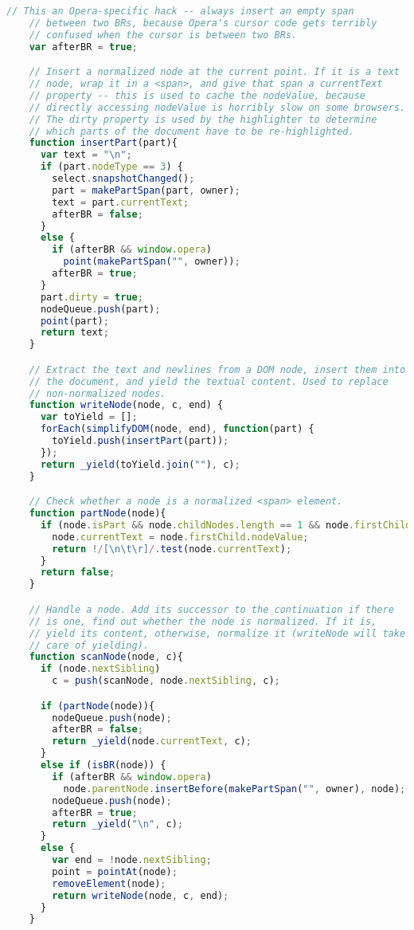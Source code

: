 \begin{lstlisting}[language=Javascript]
    // This an Opera-specific hack -- always insert an empty span
    // between two BRs, because Opera's cursor code gets terribly
    // confused when the cursor is between two BRs.
    var afterBR = true;

    // Insert a normalized node at the current point. If it is a text
    // node, wrap it in a <span>, and give that span a currentText
    // property -- this is used to cache the nodeValue, because
    // directly accessing nodeValue is horribly slow on some browsers.
    // The dirty property is used by the highlighter to determine
    // which parts of the document have to be re-highlighted.
    function insertPart(part){
      var text = "\n";
      if (part.nodeType == 3) {
        select.snapshotChanged();
        part = makePartSpan(part, owner);
        text = part.currentText;
        afterBR = false;
      }
      else {
        if (afterBR && window.opera)
          point(makePartSpan("", owner));
        afterBR = true;
      }
      part.dirty = true;
      nodeQueue.push(part);
      point(part);
      return text;
    }

    // Extract the text and newlines from a DOM node, insert them into
    // the document, and yield the textual content. Used to replace
    // non-normalized nodes.
    function writeNode(node, c, end) {
      var toYield = [];
      forEach(simplifyDOM(node, end), function(part) {
        toYield.push(insertPart(part));
      });
      return _yield(toYield.join(""), c);
    }

    // Check whether a node is a normalized <span> element.
    function partNode(node){
      if (node.isPart && node.childNodes.length == 1 && node.firstChild.nodeType == 3) {
        node.currentText = node.firstChild.nodeValue;
        return !/[\n\t\r]/.test(node.currentText);
      }
      return false;
    }

    // Handle a node. Add its successor to the continuation if there
    // is one, find out whether the node is normalized. If it is,
    // yield its content, otherwise, normalize it (writeNode will take
    // care of yielding).
    function scanNode(node, c){
      if (node.nextSibling)
        c = push(scanNode, node.nextSibling, c);

      if (partNode(node)){
        nodeQueue.push(node);
        afterBR = false;
        return _yield(node.currentText, c);
      }
      else if (isBR(node)) {
        if (afterBR && window.opera)
          node.parentNode.insertBefore(makePartSpan("", owner), node);
        nodeQueue.push(node);
        afterBR = true;
        return _yield("\n", c);
      }
      else {
        var end = !node.nextSibling;
        point = pointAt(node);
        removeElement(node);
        return writeNode(node, c, end);
      }
    }


\end{lstlisting}
